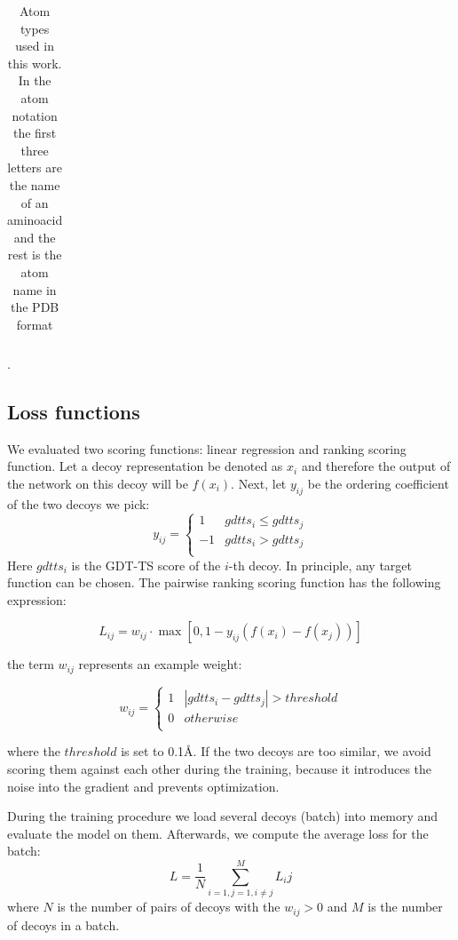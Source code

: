 \documentclass[a4paper,10pt]{article}
\begin{document}
\begin{table}[H]
\begin{center}
\begin{tabular}{ c | l | l }
\end{tabular}
    
    \caption {Atom types used in this work. In the atom notation the first three letters are the name of an aminoacid and the rest is 
    the atom name in the PDB format \cite{}}.
    \label{Tbl:atomTypes}
\end{center}
\end{table}

\subsection{Loss functions}
We evaluated two scoring functions: linear regression and ranking scoring function. 
Let a decoy representation be denoted as $x_i$ and therefore the output
of the network on this decoy will be $f(x_i)$. Next, let $y_{ij}$ be the ordering coefficient of the two decoys we pick: 
$$
y_{ij} = \begin{cases}
               1& gdtts_i \leq gdtts_j \\
               -1& gdtts_i > gdtts_j \\
            \end{cases}
$$
Here $gdtts_i$ is the GDT-TS score of the $i$-th decoy. In principle, any target function can be chosen. 
The pairwise ranking scoring function has the following expression:

$$ L_{ij} = w_{ij} \cdot \max \left[ 0, 1 - y_{ij} \left( f \left( x_i \right) - f \left( x_j \right) \right) \right] $$

the term $w_{ij}$ represents an example weight:

$$
w_{ij} = \begin{cases}
               1& \left| gdtts_i - gdtts_j \right| > threshold \\
               0& otherwise \\ 
            \end{cases}
$$

where the $threshold$ is set to 0.1{\AA}. If the two decoys are too similar, 
we avoid scoring them against each other during the training, because it introduces 
the noise into the gradient and prevents optimization.


During the training procedure we load several decoys (batch) into memory and evaluate the model on them. 
Afterwards, we compute the average loss for the batch:
$$ L = \frac{1}{N} \sum_{i=1,j=1, i \neq j}^{M} L_ij $$ 
where $N$ is the number of pairs of decoys with the $w_{ij} > 0$ and $M$ is the number of decoys in a batch.
\end{document}

